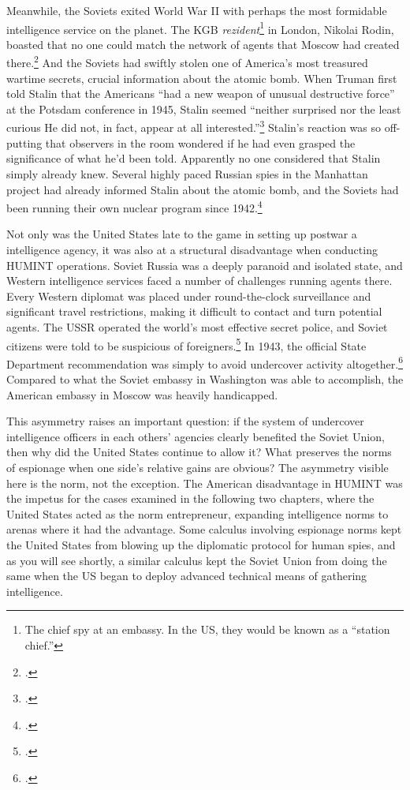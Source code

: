 \documentclass{memoir}
\begin{document}
\begin{refsegment}
Meanwhile, the Soviets exited World War II with perhaps the most formidable intelligence service on the planet. The KGB \emph{rezident}\footnote{The chief spy at an embassy. In the US, they would be known as a ``station chief.''} in London, Nikolai Rodin, boasted that no one could match the network of agents that Moscow had created there.\footcite[p.~151]{haslam_near_2015} And the Soviets had swiftly stolen one of America's most treasured wartime secrets, crucial information about the atomic bomb. When Truman first told Stalin that the Americans ``had a new weapon of unusual destructive force'' at the Potsdam conference in 1945, Stalin seemed ``neither surprised nor the least curious \textelp{} He did not, in fact, appear at all interested.''\footcite[p.~443]{mccullough_truman_1992}  Stalin's reaction was so off-putting that observers in the room wondered if he had even grasped the significance of what he'd been told. Apparently no one considered that Stalin simply already knew. Several highly paced Russian spies in the Manhattan project had already informed Stalin about the atomic bomb, and the Soviets had been running their own nuclear program since 1942.\footcite[p.~443]{mccullough_truman_1992}

Not only was the United States late to the game in setting up postwar a intelligence agency, it was also at a structural disadvantage when conducting HUMINT operations. Soviet Russia was a deeply paranoid and isolated state, and Western intelligence services faced a number of challenges running agents there. Every Western diplomat was placed under round-the-clock surveillance and significant travel restrictions, making it difficult to contact and turn potential agents. The USSR operated the world's most effective secret police, and Soviet citizens were told to be suspicious of foreigners.\footcite[p.~42]{richelson_american_1987} In 1943, the official State Department recommendation was simply to avoid undercover activity altogether.\footcite[p.~44]{richelson_american_1987} Compared to what the Soviet embassy in Washington was able to accomplish, the American embassy in Moscow was heavily handicapped.

This asymmetry raises an important question: if the system of undercover intelligence officers in each others' agencies clearly benefited the Soviet Union, then why did the United States continue to allow it? What preserves the norms of espionage when one side's relative gains are obvious? The asymmetry visible here is the norm, not the exception. The American disadvantage in HUMINT was the impetus for the cases examined in the following two chapters, where the United States acted as the norm entrepreneur, expanding intelligence norms to arenas where it had the advantage. Some calculus involving espionage norms kept the United States from blowing up the diplomatic protocol for human spies, and as you will see shortly, a similar calculus kept the Soviet Union from doing the same when the US began to deploy advanced technical means of gathering intelligence.


\end{refsegment}
\end{document}
